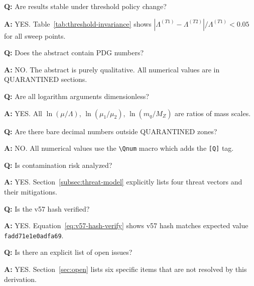 \documentclass[11pt,a4paper]{article}
\theoremstyle{definition}
\begin{document}
\begin{trapbox}
\textbf{Q:} Are results stable under threshold policy change?

\textbf{A:} YES. Table~\ref{tab:threshold-invariance} shows
$|\Lambda^{(T1)} - \Lambda^{(T2)}|/\Lambda^{(T1)} < 0.05$ for all sweep points.
\end{trapbox}

\begin{trapbox}
\textbf{Q:} Does the abstract contain PDG numbers?

\textbf{A:} NO. The abstract is purely qualitative.
All numerical values are in QUARANTINED sections.
\end{trapbox}

\begin{trapbox}
\textbf{Q:} Are all logarithm arguments dimensionless?

\textbf{A:} YES. All $\ln(\mu/\Lambda)$, $\ln(\mu_1/\mu_2)$, $\ln(m_q/M_Z)$
are ratios of mass scales.
\end{trapbox}

\begin{trapbox}
\textbf{Q:} Are there bare decimal numbers outside QUARANTINED zones?

\textbf{A:} NO. All numerical values use the \texttt{\textbackslash Qnum}
macro which adds the \texttt{[Q]} tag.
\end{trapbox}

\begin{trapbox}
\textbf{Q:} Is contamination risk analyzed?

\textbf{A:} YES. Section~\ref{subsec:threat-model} explicitly lists
four threat vectors and their mitigations.
\end{trapbox}

\begin{trapbox}
\textbf{Q:} Is the v57 hash verified?

\textbf{A:} YES. Equation~\eqref{eq:v57-hash-verify} shows v57 hash matches
expected value \texttt{fadd71e1e0adfa69}.
\end{trapbox}

\begin{trapbox}
\textbf{Q:} Is there an explicit list of open issues?

\textbf{A:} YES. Section~\ref{sec:open} lists six specific items that
are not resolved by this derivation.
\end{trapbox}
\end{document}
